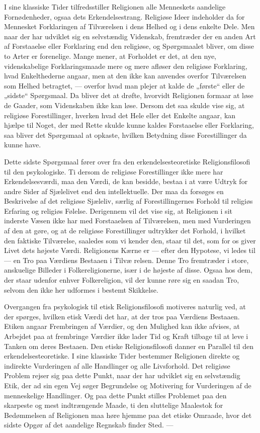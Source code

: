 \documentclass[12pt,a4paper,openany]{book}
\newcommand{\opage}[1]{\marginnote{\footnotesize\textit{[#1]}}}
\begin{document}
I sine klassiske Tider tilfredsstiller Religionen alle Menneskets
aandelige Fornødenheder, ogsaa dets Erkendelsestrang. Religiøse Ideer
indeholder da for Mennesket Forklaringen af Tilværelsen i dens Helhed og
i dens enkelte Dele. Men naar der har udviklet sig en selvstændig
Videnskab, fremtræder der en anden Art af Forstaaelse eller Forklaring
end den religiøse, og Spørgsmaalet bliver, om disse to Arter er
forenelige. Mange mener, at Forholdet er det, at den nye, videnskabelige
Forklaringsmaade mere og mere afløser den religiøse Forklaring, hvad
Enkelthederne angaar, men at den ikke kan anvendes overfor Tilværelsen
som Helhed betragtet, --- overfor hvad man plejer at kalde de „første“
eller de „sidste“ Spørgsmaal. Da bliver det at drøfte, hvorvidt
Religionen formaar at løse de Gaader, som Videnskaben ikke kan løse.
Dersom det saa skulde vise sig, at religiøse Forestillinger, hverken
hvad det Hele eller det Enkelte angaar, kan hjælpe til Noget, der med
Rette skulde kunne kaldes Forstaaelse eller Forklaring, saa bliver det
Spørgsmaal at opkaste, hvilken Betydning disse Forestillinger da kunne
have.

Dette sidste Spørgsmaal fører over fra den erkendelsesteoretiske
Religionsfilosofi til den psykologiske. Ti dersom de religiøse
Forestillinger ikke mere har Erkendelsesværdi, maa den Værdi, de kan
besidde, bestaa i at være Udtryk for andre Sider af Sjælelivet end den
intellektuelle. Der maa da forsøges en Beskrivelse af det religiøse
Sjæleliv, særlig af Forestillingernes Forhold til religiøs Erfaring og
religiøs Følelse. Derigennem vil det vise sig, at Religionen i sit
inderste Væsen ikke har med Forstaaelsen af Tilværelsen, men med
Vurderingen af den at gøre, og at de religiøse Forestillinger udtrykker
det Forhold, i hvilket den faktiske Tilværelse, saaledes som vi kender
den, staar til det, som for os giver Livet dets højeste Værdi.
Religionens Kærne er --- efter den Hypotese, vi ledes til --- en Tro paa
Værdiens Bestaaen i Tilvæ%
\opage{7}relsen. Denne Tro fremtræder i store, anskuelige Billeder i
Folkereligionerne, især i de højeste af disse. Ogsaa hos dem, der staar
udenfor enhver Folkereligion, vil der kunne røre sig en saadan Tro,
selvom den ikke her udformes i bestemt Skikkelse.

Overgangen fra psykologisk til etisk Religionsfilosofi motiveres
naturlig ved, at der spørges, hvilken etisk Værdi det har, at der tros
paa Værdiens Bestaaen. Etiken angaar Frembringen af Værdier, og den
Mulighed kan ikke afvises, at Arbejdet paa at frembringe Værdier ikke
lader Tid og Kraft tilbage til at leve i Tanken om deres Bestaaen. Den
etiske Religionsfilosofi danner en Parallel til den
erkendelsesteoretiske. I sine klassiske Tider bestemmer Religionen
direkte og indirekte Vurderingen af alle Handlinger og alle Livsforhold.
Det religiøse Problem rejser sig paa dette Punkt, naar der har udviklet
sig en selvstændig Etik, der ad sin egen Vej søger Begrundelse og
Motivering for Vurderingen af de menneskelige Handlinger. Og paa dette
Punkt stilles Problemet paa den skarpeste og mest indtrængende Maade, ti
den sluttelige Maalestok for Bedømmelsen af Religionen maa høre hjemme
paa det etiske Omraade, hvor det sidste Opgør af det aandelige Regnskab
finder Sted. ---
\end{document}
